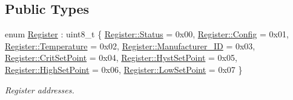 \subsection*{Public Types}
\begin{DoxyCompactItemize}
\item 
enum \hyperlink{classcubesat_1_1ADT7311_a0c841a239b3da653d4304377b3e83b45}{Register} \+: uint8\+\_\+t \{ \newline
\hyperlink{classcubesat_1_1ADT7311_a0c841a239b3da653d4304377b3e83b45aec53a8c4f07baed5d8825072c89799be}{Register\+::\+Status} = 0x00, 
\hyperlink{classcubesat_1_1ADT7311_a0c841a239b3da653d4304377b3e83b45afa535ffb25e1fd20341652f9be21e06e}{Register\+::\+Config} = 0x01, 
\hyperlink{classcubesat_1_1ADT7311_a0c841a239b3da653d4304377b3e83b45aee7a8e262285ed49ea1b4e4ae11525bd}{Register\+::\+Temperature} = 0x02, 
\hyperlink{classcubesat_1_1ADT7311_a0c841a239b3da653d4304377b3e83b45aa7d89735574041405dafefe7c2c15afb}{Register\+::\+Manufacturer\+\_\+\+ID} = 0x03, 
\newline
\hyperlink{classcubesat_1_1ADT7311_a0c841a239b3da653d4304377b3e83b45ad7a94d133d1316be5d89f1cd8796b7fa}{Register\+::\+Crit\+Set\+Point} = 0x04, 
\hyperlink{classcubesat_1_1ADT7311_a0c841a239b3da653d4304377b3e83b45aa904db05d93ac11f90d0c6dabdbca25c}{Register\+::\+Hyst\+Set\+Point} = 0x05, 
\hyperlink{classcubesat_1_1ADT7311_a0c841a239b3da653d4304377b3e83b45a0c6f114f7df080df2f10b75e96223dc3}{Register\+::\+High\+Set\+Point} = 0x06, 
\hyperlink{classcubesat_1_1ADT7311_a0c841a239b3da653d4304377b3e83b45a4011b21f421577265c398f33412b0216}{Register\+::\+Low\+Set\+Point} = 0x07
 \}\begin{DoxyCompactList}\small\item\em Register addresses. \end{DoxyCompactList}
\end{DoxyCompactItemize}
